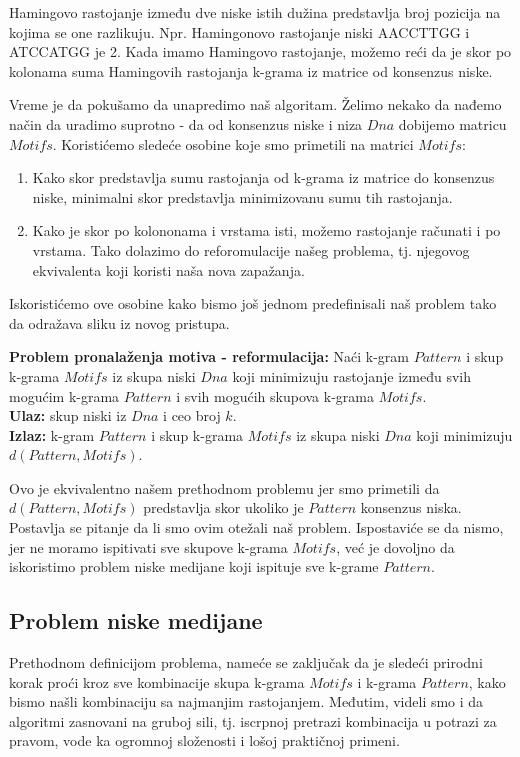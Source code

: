Hamingovo rastojanje između dve niske istih dužina predstavlja broj pozicija na kojima se one razlikuju. Npr. Hamingonovo rastojanje niski AACCTTGG i ATCCATGG je 2. Kada imamo Hamingovo rastojanje, možemo reći da je skor po kolonama suma Hamingovih rastojanja k-grama iz matrice od konsenzus niske. 


Vreme je da pokušamo da unapredimo naš algoritam. Želimo nekako da nađemo način da uradimo suprotno - da od konsenzus niske i niza $Dna$ dobijemo matricu $Motifs$. 
Koristićemo sledeće osobine koje smo primetili na matrici $Motifs$:
\begin{enumerate}
    \item Kako skor predstavlja sumu rastojanja od k-grama iz matrice do konsenzus niske, minimalni skor predstavlja minimizovanu sumu tih rastojanja.
    \item Kako je skor po kolononama i vrstama isti, možemo rastojanje računati i po vrstama. 
    Tako dolazimo do reforomulacije našeg problema, tj. njegovog ekvivalenta koji koristi naša nova zapažanja.
\end{enumerate}

Iskoristićemo ove osobine kako bismo još jednom predefinisali naš problem tako da odražava sliku iz novog pristupa.

\begin{tcolorbox}
\textbf{Problem pronalaženja motiva - reformulacija:} Naći k-gram $Pattern$ i skup k-grama $Motifs$ iz skupa niski $Dna$ koji minimizuju rastojanje između svih mogućim k-grama $Pattern$ i svih mogućih skupova k-grama $Motifs$.\\
\textbf{Ulaz:} skup niski iz $Dna$ i ceo broj $k$.\\
\textbf{Izlaz:} k-gram $Pattern$ i skup k-grama $Motifs$ iz skupa niski $Dna$ koji minimizuju $d(Pattern, Motifs)$.
\end{tcolorbox}

\noindent Ovo je ekvivalentno našem prethodnom problemu jer smo primetili da $d(Pattern, Motifs)$ predstavlja skor ukoliko je $Pattern$ konsenzus niska. Postavlja se pitanje da li smo ovim otežali naš problem. Ispostaviće se da nismo, jer ne moramo ispitivati sve skupove k-grama $Motifs$, već je dovoljno da iskoristimo problem niske medijane koji ispituje sve k-grame $Pattern$. 

\subsection{Problem niske medijane}
Prethodnom definicijom problema, nameće se zaključak da je sledeći prirodni korak proći kroz sve kombinacije skupa k-grama $Motifs$ i k-grama $Pattern$, kako bismo našli kombinaciju sa najmanjim rastojanjem. Međutim, videli smo i da algoritmi zasnovani na gruboj sili, tj. iscrpnoj pretrazi kombinacija u potrazi za pravom, vode ka ogromnoj složenosti i lošoj praktičnoj primeni. 

